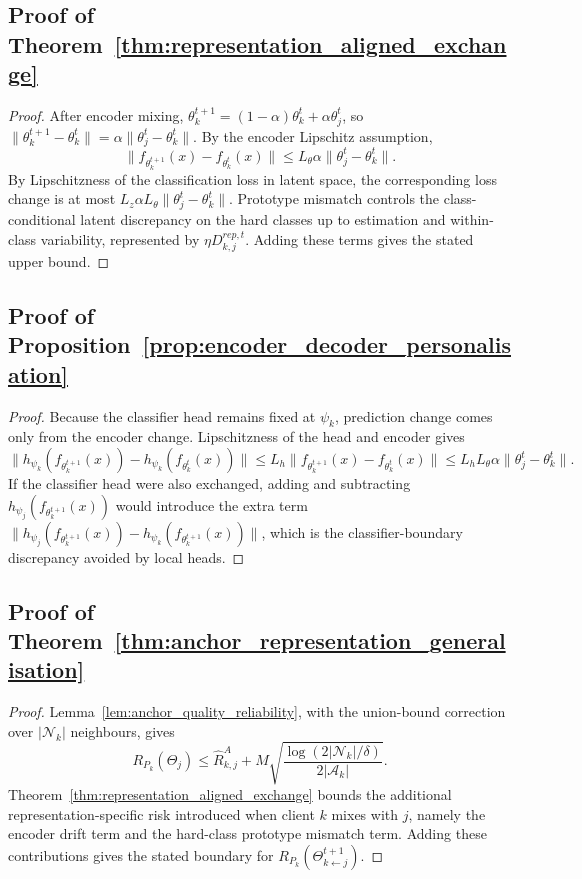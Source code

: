 \documentclass[conference]{IEEEtran}
\begin{document}
\subsection{Proof of Theorem~\ref{thm:representation_aligned_exchange}}
\begin{proof}
After encoder mixing, \(\theta_k^{t+1}=(1-\alpha)\theta_k^t+\alpha\theta_j^t\), so \(\|\theta_k^{t+1}-\theta_k^t\|=\alpha\|\theta_j^t-\theta_k^t\|\). By the encoder Lipschitz assumption,
\[
\|f_{\theta_k^{t+1}}(x)-f_{\theta_k^t}(x)\|
\leq
L_\theta\alpha\|\theta_j^t-\theta_k^t\|.
\]
By Lipschitzness of the classification loss in latent space, the corresponding loss change is at most \(L_z\alpha L_\theta\|\theta_j^t-\theta_k^t\|\). Prototype mismatch controls the class-conditional latent discrepancy on the hard classes up to estimation and within-class variability, represented by \(\eta D_{k,j}^{rep,t}\). Adding these terms gives the stated upper bound.
\end{proof}

\subsection{Proof of Proposition~\ref{prop:encoder_decoder_personalisation}}
\begin{proof}
Because the classifier head remains fixed at \(\psi_k\), prediction change comes only from the encoder change. Lipschitzness of the head and encoder gives
\[
\|h_{\psi_k}(f_{\theta_k^{t+1}}(x))
-h_{\psi_k}(f_{\theta_k^t}(x))\|
\leq
L_h\|f_{\theta_k^{t+1}}(x)-f_{\theta_k^t}(x)\|
\leq
L_hL_\theta\alpha\|\theta_j^t-\theta_k^t\|.
\]
If the classifier head were also exchanged, adding and subtracting \(h_{\psi_j}(f_{\theta_k^{t+1}}(x))\) would introduce the extra term \(\|h_{\psi_j}(f_{\theta_k^{t+1}}(x))-h_{\psi_k}(f_{\theta_k^{t+1}}(x))\|\), which is the classifier-boundary discrepancy avoided by local heads.
\end{proof}

\subsection{Proof of Theorem~\ref{thm:anchor_representation_generalisation}}
\begin{proof}
Lemma~\ref{lem:anchor_quality_reliability}, with the union-bound correction over \(|\mathcal{N}_k|\) neighbours, gives
\[
R_{P_k}(\Theta_j)
\leq
\widehat{R}_{k,j}^{A}
+
M\sqrt{
\frac{\log(2|\mathcal{N}_k|/\delta)}
{2|\mathcal{A}_k|}
}.
\]
Theorem~\ref{thm:representation_aligned_exchange} bounds the additional representation-specific risk introduced when client \(k\) mixes with \(j\), namely the encoder drift term and the hard-class prototype mismatch term. Adding these contributions gives the stated boundary for \(R_{P_k}(\Theta_{k\leftarrow j}^{t+1})\).
\end{proof}
\end{document}
